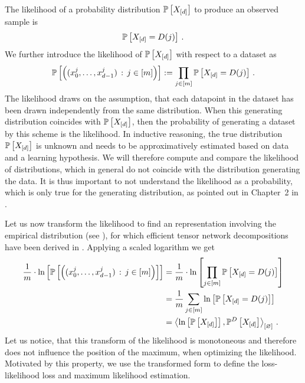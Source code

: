 The likelihood of a probability distribution $\mathbb{P}\left[X_{[d]}\right]$ to produce an observed sample is
\begin{align*}
    \mathbb{P}\left[X_{[d]} = D(j)\right] \, .
\end{align*}
We further introduce the likelihood of $\mathbb{P}\left[X_{[d]}\right]$ with respect to a dataset as
\begin{align*}
    \mathbb{P}\left[\left(({x_{0}^{j},\ldots,x_{d-1}^{j}})\,:\,j\in[m]\right)\right] := \prod_{j\in[m]} \mathbb{P}\left[X_{[d]} = D(j)\right] \, .
\end{align*}
The likelihood draws on the assumption, that each datapoint in the dataset has been drawn independently from the same distribution.
When this generating distribution coincides with $\mathbb{P}\left[X_{[d]}\right]$, then the probability of generating a dataset by this scheme is the likelihood.
In inductive reasoning, the true distribution $\mathbb{P}\left[X_{[d]}\right]$ is unknown and needs to be approximatively estimated based on data and a learning hypothesis.
We will therefore compute and compare the likelihood of distributions, which in general do not coincide with the distribution generating the data.
It is thus important to not understand the likelihood as a probability, which is only true for the generating distribution, as pointed out in Chapter~2 in \cite{mackay_information_2003}.

Let us now transform the likelihood to find an representation involving the empirical distribution (see ), for which efficient tensor network decompositions have been derived in .
Applying a scaled logarithm we get
\begin{align*}
    \frac{1}{m} \cdot \ln \left[ \mathbb{P}\left[\left(({x_{0}^{j},\ldots,x_{d-1}^{j}})\,:\,j\in[m]\right)\right] \right]
    &= \frac{1}{m} \cdot \ln \left[ \prod_{j\in[m]} \mathbb{P}\left[X_{[d]} = D(j)\right] \right] \\
    &= \frac{1}{m}\sum_{j\in[m]} \ln \left[ \mathbb{P}\left[X_{[d]} = D(j)\right] \right] \\
    &= \left\langle \ln \left[ \mathbb{P}\left[X_{[d]}\right] \right],\mathbb{P}^{D}\left[X_{[d]}\right]\right\rangle_{\left[ \varnothing \right]} \, .
\end{align*}
Let us notice, that this transform of the likelihood is monotoneous and therefore does not influence the position of the maximum, when optimizing the likelihood.
Motivated by this property, we use the transformed form to define the loss-likelihood loss and maximum likelihood estimation.

